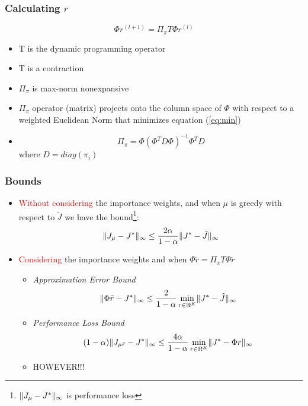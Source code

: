 \documentclass{beamer}
\DeclarePairedDelimiter{\norm}{\lVert}{\rVert}
\newcommand{\tc}[2]{\textcolor{#1}{#2}}
\newcommand{\tcr}[1]{\tc{red}{#1}}
\begin{document}

\begin{frame}
	\frametitle{Calculating $r$}
		\[
			\Phi r^{(l+1)} = \Pi_{\pi} T \Phi r^{(l)}
		\]
	\begin{itemize}
		\item T is the dynamic programming operator
		\item T is a contraction
		\item $\Pi_\pi$ is max-norm nonexpansive
		\item $\Pi_\pi$ operator (matrix) projects onto the column space of $\Phi$ with respect to a weighted Euclidean Norm that minimizes equation (\ref{eq:min})
		\item 
		\[
			\Pi_\pi = \Phi(\Phi^T D \Phi)^{-1} \Phi^T D
		\]
		where $D=diag(\pi_i)$
	\end{itemize}
\end{frame}


\begin{frame}
	\frametitle{Bounds}
	\begin{itemize}
		\item \tcr{Without considering} the importance weights, and when $\mu$ is greedy with respect to $\tilde{J}$ we have the bound\footnote{$\norm{J_\mu - J^*}_{\infty}$ is performance loss}:
		\begin{equation}
			\norm{J_\mu - J^*}_{\infty} \leq \frac{2\alpha}{1-\alpha}\norm{J^* - \tilde{J}}_{\infty}
		\end{equation}
		\item \tcr{Considering} the importance weights and when $\Phi \tilde{r} = \Pi_{\pi} T \Phi \tilde{r}$
		\begin{itemize}
			\item \emph{Approximation Error Bound}
			\[
				\norm{\Phi \tilde{r} - J^*}_{\infty} \leq \frac{2}{1-\alpha} \min\limits_{r \in \Re^K}\norm{J^* - \tilde{J}}_{\infty}
			\]
			\item \emph{Performance Loss Bound}
			\[
				(1-\alpha)\norm{J_{\mu \tilde{r}} - J^*}_{\infty} \leq \frac{4\alpha}{1-\alpha}\min\limits_{r \in \Re^K}\norm{J^* - \Phi r}_{\infty}
			\]
			\item HOWEVER!!!
		\end{itemize}
	\end{itemize}
\end{frame}
\end{document}
